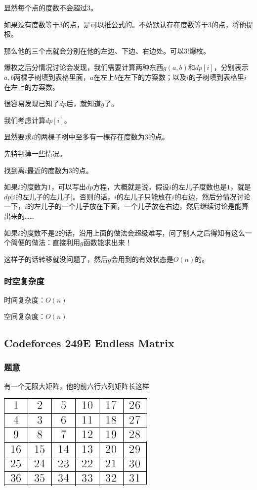 \documentclass{ctexart}
\begin{document}
显然每个点的度数不会超过$3$。

如果没有度数等于$3$的点，是可以推公式的。不妨默认存在度数等于$3$的点，将他提根。

那么他的三个点就会分别在他的左边、下边、右边处。可以$3!$爆枚。

爆枚之后分情况讨论会发现，我们需要计算两种东西$g(a,b)$和$dp[i]$，分别表示$a,b$两棵子树填到表格里面，$a$在左上$b$在左下的方案数；以及$i$的子树填到表格里$i$在左上的方案数。

很容易发现已知了$dp$后，就知道$g$了。

我们考虑计算$dp[i]$。

显然要求$i$的两棵子树中至多有一棵存在度数为$3$的点。

先特判掉一些情况。

找到离$i$最近的度数为$3$的点。

如果$i$的度数为$1$，可以写出$dp$方程，大概就是说，假设$i$的左儿子度数也是$1$，就是$dp[i$的左儿子的左儿子$]$。否则的话，$i$的左儿子只能放在$i$的右边，然后分情况讨论一下，$i$的左儿子的一个儿子放在下面，一个儿子放在右边，然后继续讨论是能算出来的……

如果$i$的度数不是$2$的话，沿用上面的做法会超级难写，问了别人之后得知有这么一个简便的做法：直接利用$g$函数能求出来！

这样子的话转移就没问题了，然后$g$会用到的有效状态是$O(n)$的。
\subsubsection{时空复杂度}
时间复杂度：$O(n)$

空间复杂度：$O(n)$
\subsection{Codeforces 249E Endless Matrix}
\subsubsection{题意}
有一个无限大矩阵，他的前六行六列矩阵长这样

\includegraphics{matrix.png}
\end{document}
